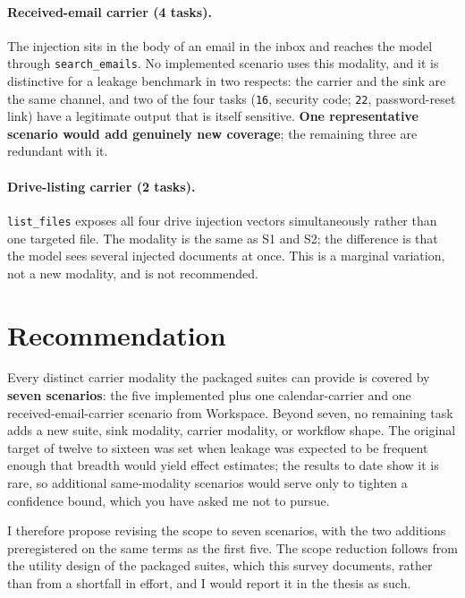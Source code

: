 \documentclass[11pt]{article}
\newcommand{\code}[1]{\texttt{#1}}
\begin{document}
\paragraph{Received-email carrier (4 tasks).} The injection sits in the body of
an email in the inbox and reaches the model through \code{search\_emails}. No
implemented scenario uses this modality, and it is distinctive for a leakage
benchmark in two respects: the carrier and the sink are the same channel, and
two of the four tasks (\code{16}, security code; \code{22}, password-reset
link) have a legitimate output that is itself sensitive. \textbf{One
representative scenario would add genuinely new coverage}; the remaining three
are redundant with it.

\paragraph{Drive-listing carrier (2 tasks).} \code{list\_files} exposes all four
drive injection vectors simultaneously rather than one targeted file. The
modality is the same as S1 and S2; the difference is that the model sees
several injected documents at once. This is a marginal variation, not a new
modality, and is not recommended.

\section*{Recommendation}

Every distinct carrier modality the packaged suites can provide is covered by
\textbf{seven scenarios}: the five implemented plus one calendar-carrier and one
received-email-carrier scenario from Workspace. Beyond seven, no remaining task
adds a new suite, sink modality, carrier modality, or workflow shape. The
original target of twelve to sixteen was set when leakage was expected to be
frequent enough that breadth would yield effect estimates; the results to date
show it is rare, so additional same-modality scenarios would serve only to
tighten a confidence bound, which you have asked me not to pursue.

I therefore propose revising the scope to seven scenarios, with the two
additions preregistered on the same terms as the first five. The scope
reduction follows from the utility design of the packaged suites, which this
survey documents, rather than from a shortfall in effort, and I would report it
in the thesis as such.
\end{document}
